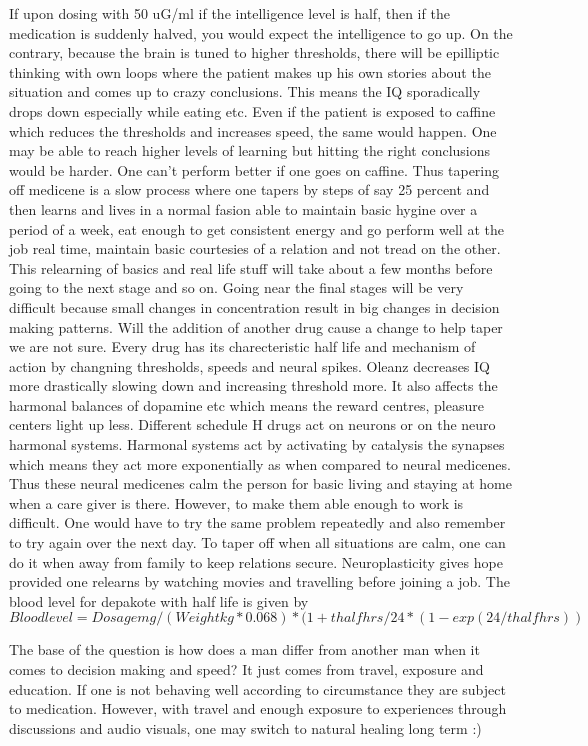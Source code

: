 If upon dosing with 50 uG/ml if the intelligence level is half, then if the medication is suddenly halved,
you would expect the intelligence to go up. On the contrary, because the brain is tuned to higher thresholds, there will be epilliptic thinking with own loops where the patient makes up his own stories about the situation and comes up to crazy conclusions. This means the IQ sporadically drops down especially while eating etc. Even if the patient is exposed to caffine which reduces the thresholds and increases speed, the same would happen. One may be able to reach higher levels of learning but hitting the right conclusions would be harder. One can't perform better if one goes on caffine. Thus tapering off medicene is a slow process where one tapers by steps of say 25 percent and then learns and lives in a normal fasion able to maintain basic hygine over a period of a week, eat enough to get consistent energy and go perform well at the job real time, maintain basic courtesies of a relation and not tread on the other. This relearning of basics and real life stuff will take about a few months before going to the next stage and so on. Going near the final stages will be very difficult because small changes in concentration result in big changes in decision making patterns. Will the addition of another drug cause a change to help taper we are not sure. Every drug has its charecteristic half life and mechanism of action by changning thresholds, speeds and neural spikes. Oleanz decreases IQ more drastically slowing down and increasing threshold more. It also affects the harmonal balances of dopamine etc which means the reward centres, pleasure centers light up less. Different schedule H drugs act on neurons or on the neuro harmonal systems. Harmonal systems act by activating by catalysis the synapses which means they act more exponentially as when compared to neural medicenes. Thus these neural medicenes calm the person for basic living and staying at home when a care giver is there. However, to make them able enough to work is difficult. One would have to try the same problem repeatedly and also remember to try again over the next day. To taper off when all situations are calm, one can do it when away from family to keep relations secure. Neuroplasticity gives hope provided one relearns by watching movies and travelling before joining a job. The blood level for depakote with half life is given by
$$Bloodlevel=Dosagemg/(Weightkg*0.068)*(1+thalfhrs/24*(1-exp(24/thalfhrs))$$

The base of the question is how does a man differ from another man when it comes to decision making and speed? It just comes from travel, exposure and education. If one is not behaving well according to circumstance they are subject to medication. However, with travel and enough exposure to experiences through discussions and audio visuals, one may switch to natural healing long term :)

